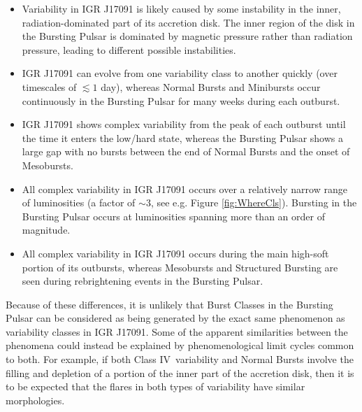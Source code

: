 \begin{itemize}
\item Variability in IGR J17091 is likely caused by some instability in the inner, radiation-dominated part of its accretion disk.  The inner region of the disk in the Bursting Pulsar is dominated by magnetic pressure rather than radiation pressure, leading to different possible instabilities.
\item IGR J17091 can evolve from one variability class to another quickly (over timescales of $\lesssim1$ day), whereas Normal Bursts and Minibursts occur continuously in the Bursting Pulsar for many weeks during each outburst.
\item IGR J17091 shows complex variability from the peak of each outburst until the time it enters the low/hard state, whereas the Bursting Pulsar shows a large gap with no bursts between the end of Normal Bursts and the onset of Mesobursts.
\item All complex variability in IGR J17091 occurs over a relatively narrow range of luminosities (a factor of $\sim3$, see e.g. Figure \ref{fig:WhereCls}).  Bursting in the Bursting Pulsar occurs at luminosities spanning more than an order of magnitude.
\item All complex variability in IGR J17091 occurs during the main high-soft portion of its outbursts, whereas Mesobursts and Structured Bursting are seen during rebrightening events in the Bursting Pulsar.
\end{itemize}

Because of these differences, it is unlikely that Burst Classes in the Bursting Pulsar can be considered as being generated by the exact same phenomenon as variability classes in IGR J17091.  Some of the apparent similarities between the phenomena could instead be explained by phenomenological limit cycles common to both.  For example, if both Class IV\indexiv\ variability and Normal Bursts involve the filling and depletion of a portion of the inner part of the accretion disk, then it is to be expected that the flares in both types of variability have similar morphologies.

